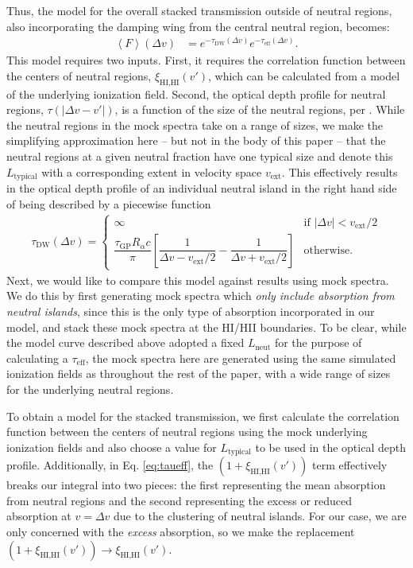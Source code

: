 Thus, the model for the overall stacked transmission outside of neutral regions, also incorporating the damping wing from the central neutral region, becomes:
\begin{align}
\left\langle F \right\rangle (\Delta v) &= e^{-\tau_{\text{DW}}(\Delta v)}e^{-\tau_{\text{eff}}(\Delta v)}.
\end{align}
This model requires two inputs. First, it requires the correlation function between the centers of neutral regions, $\xi_{\text{HI,HI}}(v')$, which can be calculated from a model of the underlying ionization field. Second, the optical depth profile for neutral regions, $\tau (|\Delta v - v'|)$, is a function of the size of the neutral regions, per . While the neutral regions in the mock spectra take on a range of sizes, we make the simplifying approximation here -- but not in the body of this paper -- that the neutral regions at a given neutral fraction have one typical size and denote this $L_{\text{typical}}$ with a corresponding extent in velocity space $v_{\text{ext}}$. This effectively results in the optical depth profile of an individual neutral island in the right hand side of  being described by a piecewise function
\begin{align}
\tau_{\text{DW}}(\Delta v) = \begin{cases} \infty &\mbox{if } |\Delta v| < v_{\text{ext}}/2 \\ \dfrac{\tau_{\text{GP}}R_{\alpha}c}{\pi}\left[ \dfrac{1}{\Delta v - v_{\text{ext}}/2} - \dfrac{1}{\Delta v + v_{\text{ext}}/2} \right] &\mbox{otherwise.} \end{cases}
\end{align}
Next, we would like to compare this model against results using mock spectra. We do this by first generating mock spectra which \textit{only include absorption from neutral islands}, since this is the only type of absorption incorporated in our model, and stack these mock spectra at the HI/HII boundaries. To be clear, while the model curve described above adopted a fixed $L_{\text{neut}}$ for the purpose of calculating a $\tau_{\text{eff}}$, the mock spectra here are generated using the same simulated ionization fields as throughout the rest of the paper, with a wide range of sizes for the underlying neutral regions. 

To obtain a model for the stacked transmission, we first calculate the correlation function between the centers of neutral regions using the mock underlying ionization fields and also choose a value for $L_{\text{typical}}$ to be used in the optical depth profile. Additionally, in Eq. \ref{eq:taueff}, the $(1 + \xi_{\text{HI,HI}}(v'))$ term effectively breaks our integral into two pieces: the first representing the mean absorption from neutral regions and the second representing the excess or reduced absorption at $v = \Delta v$ due to the clustering of neutral islands. For our case, we are only concerned with the \textit{excess} absorption, so we make the replacement $(1 + \xi_{\text{HI,HI}}(v')) \to \xi_{\text{HI,HI}}(v')$.

